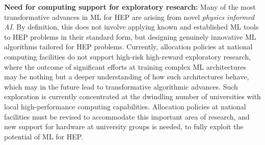 \documentclass[submission,Phys]{SciPost}
\begin{document}
{\bf Need for computing support for exploratory research:} Many of the most transformative advances in ML for HEP are arising from novel {\it physics informed AI}. By definition, this does not involve applying known and established ML tools to HEP problems in their standard form, but designing genuinely innovative ML algorithms tailored for HEP problems. Currently, allocation policies at national computing facilities do not support high-risk high-reward exploratory research, where the outcome of significant efforts at training complex ML architectures may be nothing but a deeper understanding of how such architectures behave, which may in the future lead to transformative algorithmic advances. Such exploration is currently concentrated at the dwindling number of universities with local high-performance computing capabilities. Allocation policies at national facilities must be revised to accommodate this important area of research, and new support for hardware at university groups is needed, to fully exploit the potential of ML for HEP.

\begin{comment}
\subsection{Data Science and Machine Learning in Education {\color{red} THIS WP DOES NOT SEEM TO EXIST ON ARXIV}}

The growing role of data science (DS) and machine learning (ML) in high-energy physics (HEP) is well established and appropriate given the complex detectors, large data sets and sophisticated analyses at the heart of HEP research. Moreover, exploiting symmetries inherent in physics data have inspired physics-informed ML as a vibrant sub-field of computer science research. HEP researchers benefit greatly from materials widely available for use in education, training and workforce development. They are also contributing to these materials and providing software to DS/ML-related fields. Increasingly, physics departments are offering courses at the intersection of DS, ML and physics, often using curricula developed by HEP researchers and involving open software and data used in HEP. In this white paper, we explore synergies between HEP research and DS/ML education, discuss opportunities and challenges at this intersection, and propose community activities that will be mutually beneficial.~\cite{}
\end{comment}



\end{document}
